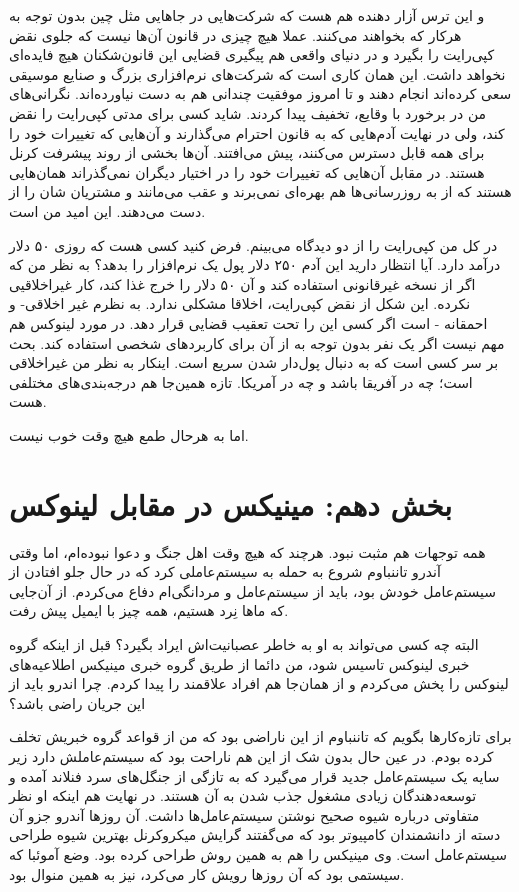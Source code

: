 و این ترس آزار دهنده هم هست که شرکت‌هایی در جاهایی مثل چین بدون توجه به
 هرکار که بخواهند می‌کنند. عملا هیچ چیزی در قانون آن‌ها نیست که
جلوی نقض کپی‌رایت را بگیرد و در دنیای واقعی هم پیگیری قضایی این
قانون‌شکنان هیچ فایده‌ای نخواهد داشت. این همان کاری است که شرکت‌های
نرم‌افزاری بزرگ و صنایع موسیقی سعی کرده‌اند انجام دهند و تا امروز موفقیت
چندانی هم به دست نیاورده‌اند. نگرانی‌های من در برخورد با وقایع، تخفیف
پیدا کردند. شاید کسی برای مدتی کپی‌رایت را نقض کند، ولی در نهایت
آدم‌هایی که به قانون احترام می‌گذارند و آن‌هایی که تغییرات خود را برای
همه قابل دسترس می‌کنند، پیش می‌‌افتند. آن‌ها بخشی از روند پیشرفت کرنل
هستند. در مقابل آن‌هایی که تغییرات خود را در اختیار دیگران نمی‌گذراند
همان‌هایی هستند که از به روزرسانی‌ها هم بهره‌ای نمی‌برند و عقب می‌مانند و
مشتریان شان را از دست می‌دهند. این امید من است.

در کل من کپی‌رایت را از دو دیدگاه می‌بینم. فرض کنید کسی هست که روزی ۵۰
دلار درآمد دارد. آیا انتظار دارید این آدم ۲۵۰ دلار پول یک نرم‌افزار را
بدهد؟‌ به نظر من که اگر از نسخه غیرقانونی استفاده کند و آن ۵۰ دلار را
خرج غذا کند، کار غیراخلاقیی نکرده. این شکل از نقض کپی‌رایت، اخلاقا
مشکلی ندارد. به نظرم غیر اخلاقی- و احمقانه - است اگر کسی این
 را تحت تعقیب قضایی قرار دهد. در مورد لینوکس هم مهم
نیست اگر یک نفر بدون توجه به  از آن برای کاربردهای شخصی
استفاده کند. بحث بر سر کسی است که به دنبال پول‌دار شدن سریع است. اینکار
به نظر من غیراخلاقی است؛ چه در آفریقا باشد و چه در آمریکا. تازه همین‌جا
هم درجه‌بندی‌های مختلفی هست.

اما به هرحال طمع هیچ وقت خوب نیست.

\section{بخش دهم: مینیکس در مقابل لینوکس}
همه توجهات هم مثبت نبود. هرچند که هیچ وقت اهل جنگ و دعوا نبوده‌ام، اما
وقتی آندرو تاننباوم شروع به حمله به سیستم‌عاملی کرد که در حال جلو
افتادن از سیستم‌عامل خودش بود، باید از سیستم‌عامل و مردانگی‌ام دفاع
می‌کردم. از آن‌جایی که ماها نِرد هستیم، همه چیز با ایمیل پیش رفت.

البته چه کسی می‌تواند به او به خاطر عصبانیت‌اش ایراد بگیرد؟‌ قبل از اینکه
گروه خبری لینوکس تاسیس شود، من دائما از طریق گروه خبری مینیکس
اطلاعیه‌های لینوکس را پخش می‌کردم و از همان‌جا هم افراد علاقمند را پیدا
کردم. چرا اندرو باید از این جریان راضی باشد؟

برای تازه‌کارها بگویم که تاننباوم از این ناراضی بود که من از قواعد گروه
خبریش تخلف کرده بودم. در عین حال بدون شک از این هم ناراحت بود که
سیستم‌عاملش دارد زیر سایه یک سیستم‌عامل جدید قرار می‌گیرد که به تازگی از
جنگل‌های سرد فنلاند آمده و توسعه‌دهندگان زیادی مشغول جذب شدن به آن
هستند. در نهایت هم اینکه او نظر متفاوتی درباره شیوه صحیح نوشتن
سیستم‌عامل‌ها داشت. آن روزها آندرو جزو آن دسته از دانشمندان کامپیوتر بود
که می‌گفتند گرایش میکروکرنل بهترین شیوه طراحی سیستم‌عامل است. وی مینیکس
را هم به همین روش طراحی کرده بود. وضع آموئبا که
سیستمی بود که آن روزها رویش کار می‌کرد، نیز به همین منوال بود.

